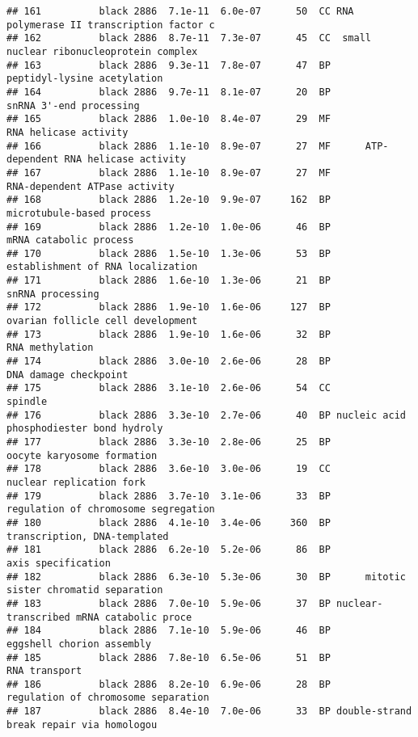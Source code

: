 \documentclass[]{article}
\begin{document}
\begin{verbatim}
## 161          black 2886  7.1e-11  6.0e-07      50  CC RNA polymerase II transcription factor c
## 162          black 2886  8.7e-11  7.3e-07      45  CC  small nuclear ribonucleoprotein complex
## 163          black 2886  9.3e-11  7.8e-07      47  BP              peptidyl-lysine acetylation
## 164          black 2886  9.7e-11  8.1e-07      20  BP                  snRNA 3'-end processing
## 165          black 2886  1.0e-10  8.4e-07      29  MF                    RNA helicase activity
## 166          black 2886  1.1e-10  8.9e-07      27  MF      ATP-dependent RNA helicase activity
## 167          black 2886  1.1e-10  8.9e-07      27  MF            RNA-dependent ATPase activity
## 168          black 2886  1.2e-10  9.9e-07     162  BP                microtubule-based process
## 169          black 2886  1.2e-10  1.0e-06      46  BP                   mRNA catabolic process
## 170          black 2886  1.5e-10  1.3e-06      53  BP        establishment of RNA localization
## 171          black 2886  1.6e-10  1.3e-06      21  BP                         snRNA processing
## 172          black 2886  1.9e-10  1.6e-06     127  BP        ovarian follicle cell development
## 173          black 2886  1.9e-10  1.6e-06      32  BP                          RNA methylation
## 174          black 2886  3.0e-10  2.6e-06      28  BP                    DNA damage checkpoint
## 175          black 2886  3.1e-10  2.6e-06      54  CC                                  spindle
## 176          black 2886  3.3e-10  2.7e-06      40  BP nucleic acid phosphodiester bond hydroly
## 177          black 2886  3.3e-10  2.8e-06      25  BP               oocyte karyosome formation
## 178          black 2886  3.6e-10  3.0e-06      19  CC                 nuclear replication fork
## 179          black 2886  3.7e-10  3.1e-06      33  BP     regulation of chromosome segregation
## 180          black 2886  4.1e-10  3.4e-06     360  BP             transcription, DNA-templated
## 181          black 2886  6.2e-10  5.2e-06      86  BP                       axis specification
## 182          black 2886  6.3e-10  5.3e-06      30  BP      mitotic sister chromatid separation
## 183          black 2886  7.0e-10  5.9e-06      37  BP nuclear-transcribed mRNA catabolic proce
## 184          black 2886  7.1e-10  5.9e-06      46  BP                eggshell chorion assembly
## 185          black 2886  7.8e-10  6.5e-06      51  BP                            RNA transport
## 186          black 2886  8.2e-10  6.9e-06      28  BP      regulation of chromosome separation
## 187          black 2886  8.4e-10  7.0e-06      33  BP double-strand break repair via homologou

\end{verbatim}
\end{document}
